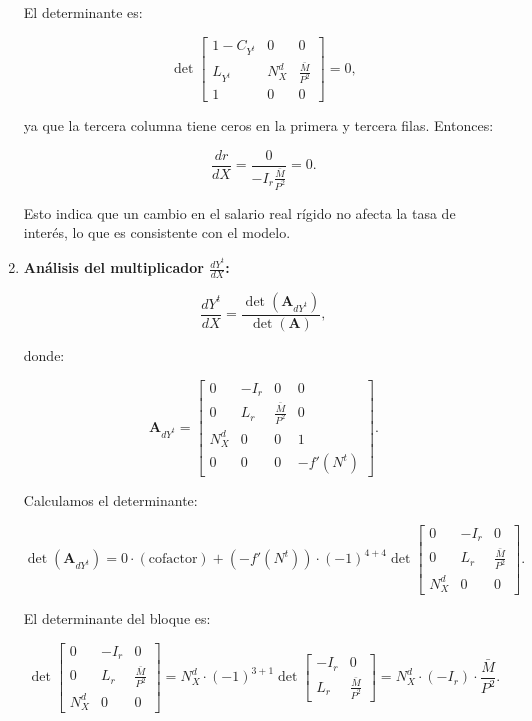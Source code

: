 \documentclass[
  doc,
  floatsintext,
  longtable,
  a4paper,
  nolmodern,
  notxfonts,
  notimes,
  colorlinks=true,linkcolor=blue,citecolor=blue,urlcolor=blue]{apa7}
\begin{document}
\begin{enumerate}
  El determinante es:

  \[
  \det \begin{bmatrix}
  1 - C_{Y^t} & 0 & 0 \\
  L_{Y^t} & N^d_X & \frac{\bar{M}}{P^2} \\
  1 & 0 & 0
  \end{bmatrix} = 0,
  \]

  ya que la tercera columna tiene ceros en la primera y tercera filas.
  Entonces:

  \[
  \frac{dr}{dX} = \frac{0}{-I_r \frac{\bar{M}}{P^2}} = 0.
  \]

  Esto indica que un cambio en el salario real rígido no afecta la tasa
  de interés, lo que es consistente con el modelo.
\item
  \textbf{Análisis del multiplicador \(\frac{dY^t}{dX}\):}

  \[
  \frac{dY^t}{dX} = \frac{\det(\mathbf{A}_{dY^t})}{\det(\mathbf{A})},
  \]

  donde:

  \[
  \mathbf{A}_{dY^t} = \begin{bmatrix}
  0 & -I_r & 0 & 0 \\
  0 & L_r & \frac{\bar{M}}{P^2} & 0 \\
  N^d_X & 0 & 0 & 1 \\
  0 & 0 & 0 & -f'(N^t)
  \end{bmatrix}.
  \]

  Calculamos el determinante:

  \[
  \det(\mathbf{A}_{dY^t}) = 0 \cdot (\text{cofactor}) + (-f'(N^t)) \cdot (-1)^{4+4} \det \begin{bmatrix}
  0 & -I_r & 0 \\
  0 & L_r & \frac{\bar{M}}{P^2} \\
  N^d_X & 0 & 0
  \end{bmatrix}.
  \]

  El determinante del bloque es:

  \[
  \det \begin{bmatrix}
  0 & -I_r & 0 \\
  0 & L_r & \frac{\bar{M}}{P^2} \\
  N^d_X & 0 & 0
  \end{bmatrix} = N^d_X \cdot (-1)^{3+1} \det \begin{bmatrix}
  -I_r & 0 \\
  L_r & \frac{\bar{M}}{P^2}
  \end{bmatrix} = N^d_X \cdot (-I_r) \cdot \frac{\bar{M}}{P^2}.
  \]


\end{enumerate}
\end{document}
